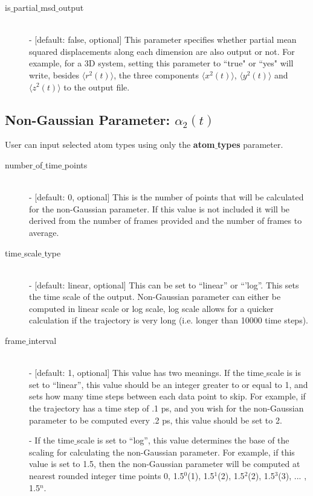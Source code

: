 \documentclass{article}
\begin{document}
\begin{description}
	\item[is$\_$partial$\_$msd$\_$output] \hfill \\
	- [default: false, optional] This parameter specifies whether partial mean squared displacements along each dimension are also output or not. For example, for a 3D system, setting this parameter to ``true" or ``yes" will write, besides $\langle r^2(t) \rangle$, the three components $\langle x^2(t) \rangle$, $\langle y^2(t) \rangle$ and $\langle z^2(t) \rangle$ to the output file. 
		
\end{description}


\subsection{Non-Gaussian Parameter: $\alpha_2(t)$} \label{sec::alpha2_parm}
User can input selected atom types using only the \textbf{atom$\_$types} parameter.
\begin{description}	
	\item[number$\_$of$\_$time$\_$points]\hfill \\
	- [default: 0, optional] This is the number of points that will be calculated for the non-Gaussian parameter.  If this value is not included it will be derived from the number of frames provided and the number of frames to average.
	
	\item[time$\_$scale$\_$type] \hfill \\
	- [default: linear, optional] This can be set to ``linear'' or ``'log''.  This sets the time scale of the output. Non-Gaussian parameter can either be computed in linear scale or log scale, log scale allows for a quicker calculation if the trajectory is very long (i.e. longer than 10000 time steps).
	
	\item[frame$\_$interval] \hfill \\
	- [default: 1, optional] This value has two meanings.  If the time$\_$scale is is set to ``linear'', this value should be an integer greater to or equal to 1, and sets how many time steps between each data point to skip.  For example, if the trajectory has a time step of .1 ps, and you wish for the non-Gaussian parameter to be computed every .2 ps, this value should be set to 2. 
	
	- If the time$\_$scale is set to ``log'', this value determines the base of the scaling for calculating the non-Gaussian parameter.   For example, if this value is set to 1.5, then the non-Gaussian parameter will be computed at nearest rounded integer time points 0, 1.5$^0$(1), 1.5$^1$(2), 1.5$^2$(2), 1.5$^3$(3), ... , 1.5$^{n}$.
	
\end{description}
\end{document}
